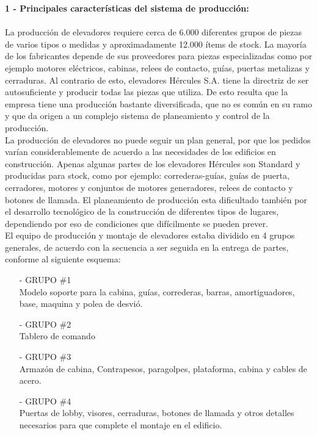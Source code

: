 \documentclass[a4paper,10pt,titlepage]{article}
\begin{document}
	\textbf{1 - Principales caracter\'isticas del sistema de producci\'on:}\\\\
		\indent La producci\'on de elevadores requiere cerca de 6.000 diferentes grupos de piezas de varios tipos o medidas y aproximadamente 12.000 \'items de stock. La mayor\'ia de los fabricantes depende de sus proveedores para piezas especializadas como por ejemplo motores el\'ectricos, cabinas, relees de contacto, gu\'ias, puertas metalizas y cerraduras. Al contrario de esto, elevadores H\'ercules S.A. tiene la directriz de ser autosuficiente y producir todas las piezas que utiliza. De esto resulta que la empresa tiene una producci\'on bastante diversificada, que no es com\'un en su ramo y que da origen a un complejo sistema de planeamiento y control de la producci\'on.\\
		\indent La producci\'on de elevadores no puede seguir un plan general, por que los pedidos var\'ian considerablemente de acuerdo a las necesidades de los edificios en construcci\'on. Apenas algunas partes de los elevadores H\'ercules son Standard y producidas para stock, como por ejemplo: correderas-gu\'ias, gu\'ias de puerta, cerradores, motores y conjuntos de motores generadores, relees de contacto y botones de llamada. El planeamiento de producci\'on esta dificultado tambi\'en por el desarrollo tecnol\'ogico de la construcci\'on de diferentes tipos de lugares, dependiendo por eso de condiciones que dif\'icilmente se pueden prever.\\
		\indent El equipo de producci\'on y montaje de elevadores estaba dividido en 4 grupos generales, de acuerdo con la secuencia a ser seguida en la entrega de partes, conforme al siguiente esquema:\\
		\begin{itemize}
		  \item[-] GRUPO \#1\\
		  Modelo soporte para la cabina, gu\'ias, correderas, barras, amortiguadores, base,
		  maquina y polea de desvi\'o.
		  \item[-] GRUPO \#2\\
		  Tablero de comando
		  \item[-] GRUPO \#3\\
		  Armaz\'on de cabina, Contrapesos, paragolpes, plataforma, cabina y cables de acero.
		  \item[-] GRUPO \#4\\
		  Puertas de lobby, visores, cerraduras, botones de llamada y otros detalles necesarios
		  para que complete el montaje en el edificio.
		\end{itemize}
\end{document}
